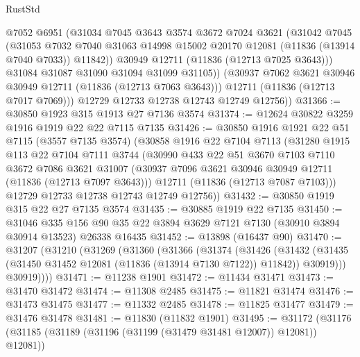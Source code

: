 \begin{lexlean}{RustStd}
\begin{coremodule}
              @7052
              @6951
              (@31034
                @7045
                @3643
                @3574
                @3672
                @7024
                @3621
                (@31042
                  @7045
                  (@31053
                    @7032
                    @7040
                    @31063
                    @14998
                    @15002
                    @20170
                    @12081
                    (@11836 (@13914 @7040 @7033))
                    @11842))
                @30949
                @12711
                (@11836 (@12713 @7025 @3643)))
              @31084
              @31087
              @31090
              @31094
              @31099
              @31105))
          (@30937 @7062 @3621 @30946 @30949 @12711 (@11836 (@12713 @7063 @3643)))
          @12711
          (@11836 (@12713 @7017 @7069)))
        @12729
        @12733
        @12738
        @12743
        @12749
        @12756))
@31366 := @30850 @1923 @315 @1913 @27 @7136 @3574
@31374 := @12624 @30822 @3259 @1916 @1919 @22 @22 @7115 @7135
@31426 := @30850
    @1916
    @1921
    @22
    @51
    @7115
    (@3557 @7135 @3574)
    (@30858
      @1916
      @22
      @7104
      @7113
      (@31280
        @1915
        @113
        @22
        @7104
        @7111
        @3744
        (@30990
          @433
          @22
          @51
          @3670
          @7103
          @7110
          @3672
          @7086
          @3621
          @31007
          (@30937 @7096 @3621 @30946 @30949 @12711 (@11836 (@12713 @7097 @3643)))
          @12711
          (@11836 (@12713 @7087 @7103)))
        @12729
        @12733
        @12738
        @12743
        @12749
        @12756))
@31432 := @30850 @1919 @315 @22 @27 @7135 @3574
@31435 := @30885 @1919 @22 @7135
@31450 := @31046
    @335
    @156
    @90
    @35
    @22
    @3894
    @3629
    @7121
    @7130
    (@30910 @3894 @30914 @13523)
    @26338
    @16435
@31452 := @13898 (@16437 @90)
@31470 := @31207
    (@31210
      (@31269
        (@31360
          (@31366
            (@31374
              (@31426
                (@31432
                  (@31435 (@31450 @31452 @12081 (@11836 (@13914 @7130 @7122)) @11842))
                  @30919)))
            @30919))))
@31471 := @11238 @1901
@31472 := @11434 @31471
@31473 := @31470 @31472
@31474 := @11308 @2485
@31475 := @11821 @31474
@31476 := @31473 @31475
@31477 := @11332 @2485
@31478 := @11825 @31477
@31479 := @31476 @31478
@31481 := @11830 (@11832 @1901)
@31495 := @31172
    (@31176 (@31185 (@31189 (@31196 (@31199 (@31479 @31481 @12007)) @12081)) @12081))

\end{coremodule}
\end{lexlean}
